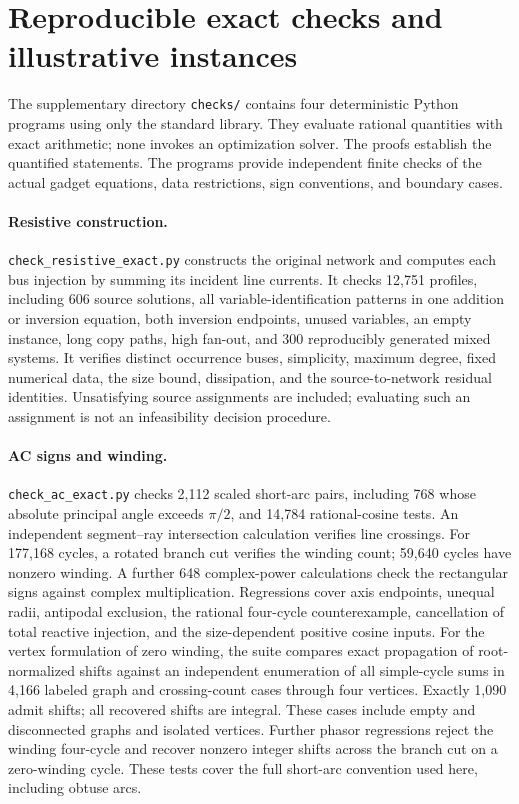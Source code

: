\section{Reproducible exact checks and illustrative instances}
\label{app:verification}

The supplementary directory \texttt{checks/} contains four deterministic
Python programs using only the standard library. They evaluate rational
quantities with exact arithmetic; none invokes an optimization solver.
The proofs establish the quantified statements. The programs provide
independent finite checks of the actual gadget equations, data restrictions,
sign conventions, and boundary cases.

\paragraph{Resistive construction.}
\texttt{check\_resistive\_exact.py} constructs the original network and
computes each bus injection by summing its incident line currents. It checks
12,751 profiles, including 606 source solutions, all variable-identification
patterns in one addition or inversion equation, both inversion endpoints,
unused variables, an empty instance, long copy paths, high fan-out, and
300 reproducibly generated mixed systems. It verifies distinct occurrence
buses, simplicity, maximum degree, fixed numerical data, the size bound,
dissipation, and the source-to-network residual identities. Unsatisfying
source assignments are included; evaluating such an assignment is not an
infeasibility decision procedure.

\paragraph{AC signs and winding.}
\texttt{check\_ac\_exact.py} checks 2,112 scaled short-arc pairs, including
768 whose absolute principal angle exceeds $\pi/2$, and 14,784 rational-cosine tests.
An independent segment--ray intersection calculation verifies line crossings.
For 177,168 cycles, a rotated branch cut verifies the winding count;
59,640 cycles have nonzero winding. A further 648 complex-power calculations
check the rectangular signs against complex multiplication. Regressions cover
axis endpoints, unequal radii, antipodal exclusion, the rational four-cycle
counterexample, cancellation of total reactive injection, and the
size-dependent positive cosine inputs. For the vertex formulation of zero winding, the
suite compares exact propagation of root-normalized shifts against an
independent enumeration of all simple-cycle sums in 4,166 labeled graph
and crossing-count cases through four vertices. Exactly 1,090 admit shifts;
all recovered shifts are integral. These cases include empty and disconnected
graphs and isolated vertices. Further phasor regressions reject the winding
four-cycle and recover nonzero integer shifts across the branch cut on a
zero-winding cycle. These tests cover the full short-arc convention used here,
including obtuse arcs.

